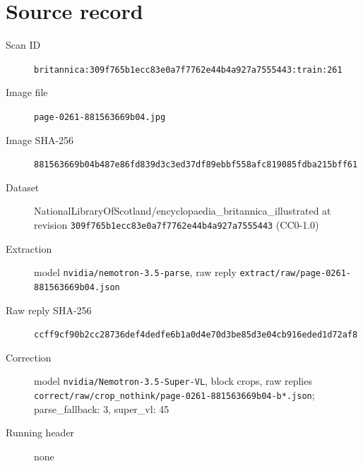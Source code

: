 \documentclass{article}
\begin{document}
\section*{Source record}
\begin{description}
\item[Scan ID] \texttt{britannica:309f765b1ecc83e0a7f7762e44b4a927a7555443:train:261}
\item[Image file] \texttt{page-0261-881563669b04.jpg}
\item[Image SHA-256] \texttt{881563669b04b487e86fd839d3c3ed37df89ebbf558afc819085fdba215bff61}
\item[Dataset] NationalLibraryOfScotland/encyclopaedia\_britannica\_illustrated at revision \texttt{309f765b1ecc83e0a7f7762e44b4a927a7555443} (CC0-1.0)
\item[Extraction] model \texttt{nvidia/nemotron-3.5-parse}, raw reply \texttt{extract/raw/page-0261-881563669b04.json}
\item[Raw reply SHA-256] \texttt{ccff9cf90b2cc28736def4dedfe6b1a0d4e70d3be85d3e04cb916eded1d72af8}
\item[Correction] model \texttt{nvidia/Nemotron-3.5-Super-VL}, block crops, raw replies \texttt{correct/raw/crop\_nothink/page-0261-881563669b04-b*.json}; parse\_fallback: 3, super\_vl: 45
\item[Running header] none
\end{description}
\end{document}
